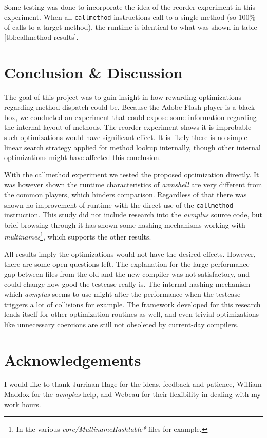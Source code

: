\documentclass[a4paper,11pt]{scrartcl}
\begin{document}
Some testing was done to incorporate the idea of the reorder experiment in this experiment. When all \texttt{callmethod} instructions call to a single method (so 100\% of calls to a target method), the runtime is identical to what was shown in table \ref{tbl:callmethod-results}.

\section{Conclusion \& Discussion}
\label{sec:discussion}

The goal of this project was to gain insight in how rewarding optimizations regarding method dispatch could be. Because the Adobe Flash player is a black box, we conducted an experiment that could expose some information regarding the internal layout of methods. The reorder experiment shows it is improbable such optimizations would have significant effect. It is likely there is no simple linear search strategy applied for method lookup internally, though other internal optimizations might have affected this conclusion.

With the callmethod experiment we tested the proposed optimization directly. It was however shown the runtime characteristics of \textit{avmshell} are very different from the common players, which hinders comparison. Regardless of that there was shown no improvement of runtime with the direct use of the \texttt{callmethod} instruction. This study did not include research into the \textit{avmplus} source code, but brief browsing through it has shown some hashing mechanisms working with \textit{multinames}\footnote{In the various \textit{core/MultinameHashtable*} files for example.}, which supports the other results.

All results imply the optimizations would not have the desired effects. However, there are some open questions left. The explanation for the large performance gap between files from the old and the new compiler was not satisfactory, and could change how good the testcase really is. The internal hashing mechanism which \textit{avmplus} seems to use might alter the performance when the testcase triggers a lot of collisions for example. The framework developed for this research lends itself for other optimization routines as well, and even trivial optimizations like unnecessary coercions are still not obsoleted by current-day compilers.

\section{Acknowledgements}
I would like to thank Jurriaan Hage for the ideas, feedback and patience, William Maddox for the \textit{avmplus} help, and Webeau for their flexibility in dealing with my work hours.
\end{document}
